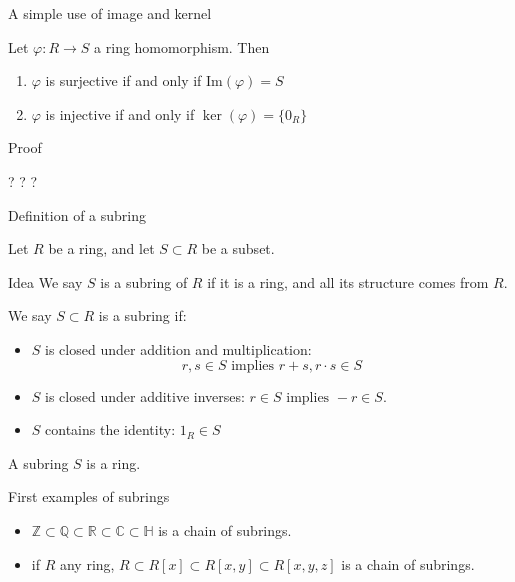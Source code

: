 \documentclass{beamer}
\begin{document}
\begin{frame}{A simple use of image and kernel}

  \begin{lemma} Let $\varphi:R\to S$ a ring homomorphism.  Then

    \begin{enumerate}
    \item $\varphi$ is surjective if and only if $\text{Im}(\varphi)=S$
      \item $\varphi$ is injective if and only if $\ker(\varphi)=\{0_R\}$
      \end{enumerate}
\end{lemma}

\begin{block}{Proof}
\begin{center} ? ? ? \end{center}
\end{block}  
  \end{frame}


\begin{frame}{Definition of a subring}

  Let $R$ be a ring, and let $S\subset R$ be a subset.
  
  \begin{block}{Idea}
    We say $S$ is a subring of $R$ if it is a ring, and all its structure comes from $R$.
  \end{block}

  \begin{definition}
We say $S\subset R$ is a subring if:
    \begin{itemize}
\item $S$ is closed under addition and multiplication:
$$r,s\in S \text{ implies } r+s, r\cdot s\in S$$
\item $S$ is closed under additive inverses: $r\in S \text{ implies } -r\in S$.
\item $S$ contains the identity: $1_R\in S$
\end{itemize}
\end{definition}

  \begin{lemma} A subring $S$ is a ring.
    \end{lemma}
  

\end{frame}


\begin{frame}{First examples of subrings}

\begin{itemize}
\item $\mathbb{Z}\subset\mathbb{Q}\subset \mathbb{R}\subset\mathbb{C}\subset\mathbb{H}$ is a chain of subrings.
\item if $R$ any ring, $R\subset R[x]\subset R[x,y]\subset R[x,y,z]$ is a chain of subrings.
\end{itemize}
\end{frame}
\end{document}
